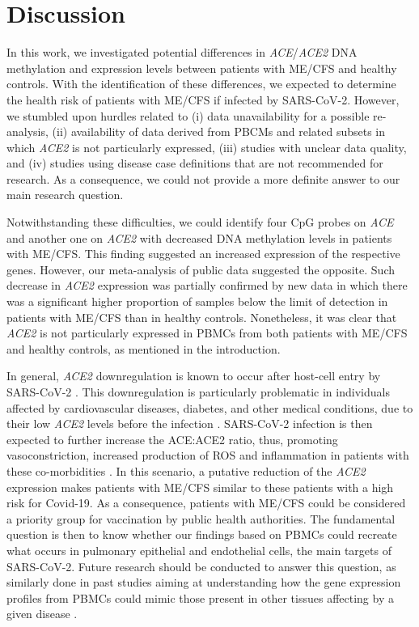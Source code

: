 \section{Discussion}

In this work, we investigated potential differences in \textit{ACE}/\textit{ACE2} DNA methylation and expression levels between patients with ME/CFS and healthy controls. With the identification of these differences, we expected to determine the health risk of patients with ME/CFS if infected by SARS-CoV-2. However, we stumbled upon hurdles related to (i) data unavailability for a possible re-analysis, (ii) availability of data derived from PBCMs and related subsets in which \textit{ACE2} is not particularly expressed, (iii) studies with unclear data quality, and (iv) studies using disease case definitions that are not recommended for research. As a consequence, we could not provide a more definite answer to our main research question.

Notwithstanding these difficulties, we could identify four CpG probes on \textit{ACE} and another one on \textit{ACE2} with decreased DNA methylation levels in patients with ME/CFS. This finding suggested an increased expression of the respective genes. However, our meta-analysis of public data suggested the opposite. Such decrease in \textit{ACE2} expression was partially confirmed by new data in which there was a significant higher proportion of samples below the limit of detection in patients with ME/CFS than in healthy controls. Nonetheless, it was clear that \textit{ACE2} is not particularly expressed in PBMCs from both patients with ME/CFS and healthy controls, as mentioned in the introduction.

In general, \textit{ACE2} downregulation is known to occur after host-cell entry by SARS-CoV-2 \citep{datta2020SARSCoV2Pandemic}. This downregulation is particularly problematic in individuals affected by cardiovascular diseases, diabetes, and other medical conditions, due to their low \textit{ACE2} levels before the infection \citep{verdecchia2020PivotalLink}. SARS-CoV-2 infection is then expected to further increase the ACE:ACE2 ratio, thus, promoting vasoconstriction, increased production of ROS and inflammation in patients with these co-morbidities \citep{pagliaro2020ACEACE2}. In this scenario, a putative reduction of the \textit{ACE2} expression makes patients with ME/CFS similar to these patients with a high risk for Covid-19. As a consequence, patients with ME/CFS could be considered a priority group for vaccination by public health authorities. The fundamental question is then to know whether our findings based on PBMCs could recreate what occurs in pulmonary epithelial and endothelial cells, the main targets of SARS-CoV-2. Future research should be conducted to answer this question, as similarly done in past studies aiming at understanding how the gene expression profiles from PBMCs could mimic those present in other tissues affecting by a given disease \citep{takamura2007GeneExpression, manoel-caetano2012GeneExpression, gerling2013GeneExpression}.

